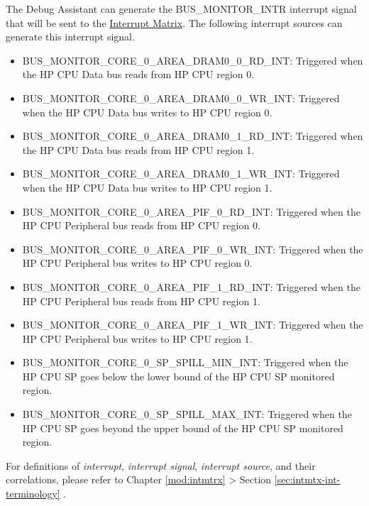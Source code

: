 \documentclass[main\_\_EN.tex]{subfiles}
\begin{document}
The Debug Assistant can generate the BUS\_MONITOR\_INTR interrupt signal that will be sent to the \hyperref[mod:intmtrx]{Interrupt Matrix}. The following interrupt sources can generate this interrupt signal.

\begin{itemize}
    \item \label{int:BUSMONITORCORE0AREADRAM00RDINT}BUS\_MONITOR\_CORE\_0\_AREA\_DRAM0\_0\_RD\_INT: Triggered when the HP CPU Data bus reads from HP CPU region 0.
    \item \label{int:BUSMONITORCORE0AREADRAM00WRINT}BUS\_MONITOR\_CORE\_0\_AREA\_DRAM0\_0\_WR\_INT: Triggered when the HP CPU Data bus writes to HP CPU region 0.
    \item \label{int:BUSMONITORCORE0AREADRAM01RDINT}BUS\_MONITOR\_CORE\_0\_AREA\_DRAM0\_1\_RD\_INT: Triggered when the HP CPU Data bus reads from HP CPU region 1.
    \item \label{int:BUSMONITORCORE0AREADRAM01WRINT}BUS\_MONITOR\_CORE\_0\_AREA\_DRAM0\_1\_WR\_INT: Triggered when the HP CPU Data bus writes to HP CPU region 1.
    \item \label{int:BUSMONITORCORE0AREAPIF0RDINT}BUS\_MONITOR\_CORE\_0\_AREA\_PIF\_0\_RD\_INT: Triggered when the HP CPU Peripheral bus reads from HP CPU region 0.
    \item \label{int:BUSMONITORCORE0AREAPIF0WRINT}BUS\_MONITOR\_CORE\_0\_AREA\_PIF\_0\_WR\_INT: Triggered when the HP CPU Peripheral bus writes to HP CPU region 0.
    \item \label{int:BUSMONITORCORE0AREAPIF1RDINT}BUS\_MONITOR\_CORE\_0\_AREA\_PIF\_1\_RD\_INT: Triggered when the HP CPU Peripheral bus reads from HP CPU region 1.
    \item \label{int:BUSMONITORCORE0AREAPIF1WRINT}BUS\_MONITOR\_CORE\_0\_AREA\_PIF\_1\_WR\_INT: Triggered when the HP CPU Peripheral bus writes to HP CPU region 1.
    \item \label{int:BUSMONITORCORE0SPSPILLMININT}BUS\_MONITOR\_CORE\_0\_SP\_SPILL\_MIN\_INT: Triggered when the HP CPU SP goes below the lower bound of the HP CPU SP monitored region.
    \item \label{int:BUSMONITORCORE0SPSPILLMAXINT}BUS\_MONITOR\_CORE\_0\_SP\_SPILL\_MAX\_INT: Triggered when the HP CPU SP goes beyond the upper bound of the HP CPU SP monitored region.
\end{itemize}

\begin{tiplisting}
For definitions of \textit{interrupt}, \textit{interrupt signal}, \textit{interrupt source}, and their correlations, please refer to Chapter \ref{mod:intmtrx} \textit{} > Section \ref{sec:intmtx-int-terminology} \textit{}.
\end{tiplisting}
\end{document}
